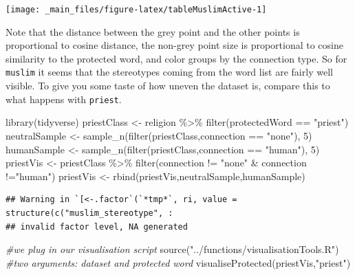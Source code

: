 \documentclass[
  12pt,
]{book}
\newenvironment{Shaded}{\begin{snugshade}}{\end{snugshade}}
\newcommand{\CommentTok}[1]{\textcolor[rgb]{0.56,0.35,0.01}{\textit{#1}}}
\newcommand{\DecValTok}[1]{\textcolor[rgb]{0.00,0.00,0.81}{#1}}
\newcommand{\FunctionTok}[1]{\textcolor[rgb]{0.00,0.00,0.00}{#1}}
\newcommand{\NormalTok}[1]{#1}
\newcommand{\OtherTok}[1]{\textcolor[rgb]{0.56,0.35,0.01}{#1}}
\newcommand{\SpecialCharTok}[1]{\textcolor[rgb]{0.00,0.00,0.00}{#1}}
\newcommand{\StringTok}[1]{\textcolor[rgb]{0.31,0.60,0.02}{#1}}
\begin{document}
\begin{center}\texttt{[image: \_main\_files/figure-latex/tableMuslimActive-1]} \end{center}
\normalsize

Note that the distance between the grey point and the other points is proportional to cosine distance, the non-grey point size is proportional to cosine similarity to the protected word, and color groups by the connection type. So for \texttt{muslim} it seems that the stereotypes coming from the word list are fairly well visible. To give you some taste of how uneven the dataset is, compare this to what happens with \texttt{priest}.

\vspace{1mm}
\footnotesize

\begin{Shaded}
\begin{Highlighting}[]
\FunctionTok{library}\NormalTok{(tidyverse)}
\NormalTok{priestClass }\OtherTok{\textless{}{-}}\NormalTok{ religion }\SpecialCharTok{\%\textgreater{}\%} \FunctionTok{filter}\NormalTok{(protectedWord }\SpecialCharTok{==} \StringTok{"priest"}\NormalTok{)}
\NormalTok{neutralSample }\OtherTok{\textless{}{-}} \FunctionTok{sample\_n}\NormalTok{(}\FunctionTok{filter}\NormalTok{(priestClass,connection }\SpecialCharTok{==} \StringTok{"none"}\NormalTok{), }\DecValTok{5}\NormalTok{)}
\NormalTok{humanSample }\OtherTok{\textless{}{-}} \FunctionTok{sample\_n}\NormalTok{(}\FunctionTok{filter}\NormalTok{(priestClass,connection }\SpecialCharTok{==} \StringTok{"human"}\NormalTok{), }\DecValTok{5}\NormalTok{)}
\NormalTok{priestVis }\OtherTok{\textless{}{-}}\NormalTok{ priestClass }\SpecialCharTok{\%\textgreater{}\%} \FunctionTok{filter}\NormalTok{(connection }\SpecialCharTok{!=} \StringTok{"none"} \SpecialCharTok{\&}\NormalTok{ connection }\SpecialCharTok{!=}\StringTok{"human"}\NormalTok{)}
\NormalTok{priestVis }\OtherTok{\textless{}{-}} \FunctionTok{rbind}\NormalTok{(priestVis,neutralSample,humanSample)}
\end{Highlighting}
\end{Shaded}

\begin{verbatim}
## Warning in `[<-.factor`(`*tmp*`, ri, value = structure(c("muslim_stereotype", :
## invalid factor level, NA generated
\end{verbatim}

\begin{Shaded}
\begin{Highlighting}[]
\CommentTok{\#we plug in our visualisation script}
\FunctionTok{source}\NormalTok{(}\StringTok{"../functions/visualisationTools.R"}\NormalTok{)}
\CommentTok{\#two arguments: dataset and protected word}
\FunctionTok{visualiseProtected}\NormalTok{(priestVis,}\StringTok{"priest"}\NormalTok{)}
\end{Highlighting}
\end{Shaded}
\end{document}
